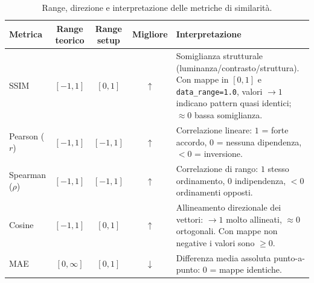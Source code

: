 \documentclass[12pt,a4paper,oneside]{report}
\numberwithin{figure}{chapter}
\numberwithin{table}{chapter}
\begin{document}
\begin{table}[H]
      \centering
      \begin{minipage}{0.98\linewidth}
            \small
            \setlength{\tabcolsep}{5pt}
            \renewcommand{\arraystretch}{1.15}
            \begin{tabularx}{\linewidth}{l c c c Y}
                  \hline
                  \textbf{Metrica}  & \textbf{Range teorico} & \textbf{Range setup} & \textbf{Migliore} & \textbf{Interpretazione}                                                                         \\
                  \hline
                  SSIM              & $[-1,1]$               & $[0,1]$              & $\uparrow$        &
                  Somiglianza strutturale (luminanza/contrasto/struttura). Con mappe in $[0,1]$ e \texttt{data\_range=1.0}, valori $\to 1$ indicano pattern quasi identici; $\approx 0$ bassa somiglianza. \\
                  Pearson ($r$)     & $[-1,1]$               & $[-1,1]$             & $\uparrow$        &
                  Correlazione lineare: $1$ = forte accordo, $0$ = nessuna dipendenza, $<0$ = inversione.                                                                                                  \\
                  Spearman ($\rho$) & $[-1,1]$               & $[-1,1]$             & $\uparrow$        &
                  Correlazione di rango: $1$ stesso ordinamento, $0$ indipendenza, $<0$ ordinamenti opposti.                                                                                               \\
                  Cosine            & $[-1,1]$               & $[0,1]$              & $\uparrow$        &
                  Allineamento direzionale dei vettori: $\to 1$ molto allineati, $\approx 0$ ortogonali. Con mappe non negative i valori sono $\ge 0$.                                                     \\
                  MAE               & $[0,\infty]$           & $[0,1]$              & $\downarrow$      &
                  Differenza media assoluta punto-a-punto: $0$ = mappe identiche.                                                                                                                          \\
                  \hline
            \end{tabularx}
            \caption{Range, direzione e interpretazione delle metriche di similarità.}
            \label{tab:metrics_range_interpretation}
      \end{minipage}
\end{table}
\end{document}
